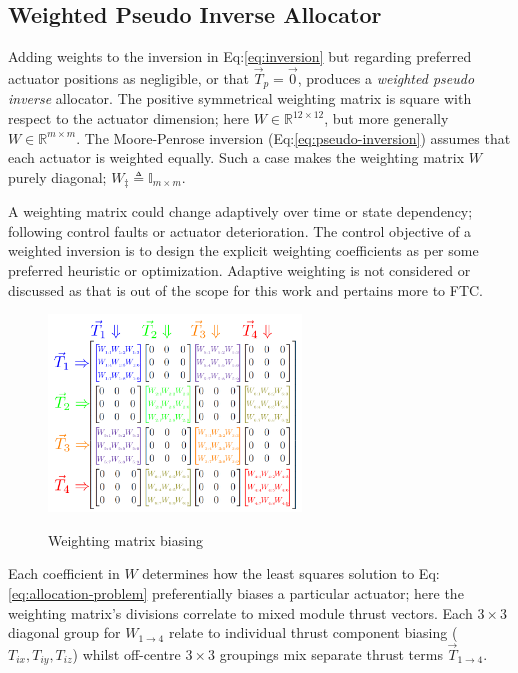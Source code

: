 \subsection{Weighted Pseudo Inverse Allocator}
\label{subsec:allocation.allocators.weightedinverse}
Adding weights to the inversion in Eq:\ref{eq:inversion} but regarding preferred actuator positions as negligible, or that $\vec{T}_p=\vec{0}$, produces a \emph{weighted pseudo inverse} allocator. The positive symmetrical weighting matrix is square with respect to the actuator dimension; here $W\in\mathbb{R}^{12\times 12}$, but more generally $W\in\mathbb{R}^{m\times m}$. The Moore-Penrose inversion (Eq:\ref{eq:pseudo-inversion}) assumes that each actuator is weighted equally. Such a case makes the weighting matrix $W$ purely diagonal; $W_\ddagger\triangleq\mathbb{I}_{m\times m}$. 
\par
A weighting matrix could change adaptively over time or state dependency; following control faults or actuator deterioration. The control objective of a weighted inversion is to design the explicit weighting coefficients as per some preferred heuristic or optimization. Adaptive weighting is not considered or discussed as that is out of the scope for this work and pertains more to FTC\cite{FTCallocation}.
\par
\begin{figure}[htbp]
\vspace{-6pt}
\centering
\includegraphics[width=0.6\textwidth]{figs/weighted-matrix}
\label{fig:weighted-matrix}
\vspace{-6pt}
\caption{Weighting matrix biasing}
\vspace{-6pt}
\end{figure}
Each coefficient in $W$ determines how the least squares solution to Eq:\ref{eq:allocation-problem} preferentially biases a particular actuator; here the weighting matrix's divisions correlate to mixed module thrust vectors. Each $3\times 3$ diagonal group for $W_{1\rightarrow 4}$ relate to individual thrust component biasing ($T_{ix},T_{iy},T_{iz}$) whilst off-centre $3\times 3$ groupings mix separate thrust terms $\vec{T}_{1\rightarrow 4}$. 
